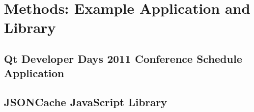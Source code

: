 \chapter{Methods: Example Application and Library}
\label{chapter:methods}

\section{Qt Developer Days 2011 Conference Schedule Application}
\label{section:devdays}

\section{JSONCache JavaScript Library}
\label{section:jsoncache}
